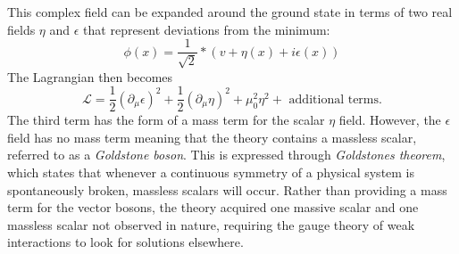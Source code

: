 This complex field can be expanded around the ground state in terms of two real fields $\eta$ and $\epsilon$ that represent deviations from the minimum:
\begin{equation}
\phi(x) = \frac{1}{\sqrt{2}}*(v+\eta(x)+i\epsilon(x))
\end{equation}
 The Lagrangian then becomes
\begin{equation}
\mathcal{L} = \frac{1}{2}(\partial_{\mu}\epsilon)^2 + \frac{1}{2}(\partial_{\mu}\eta)^2+\mu_0^2\eta^2 + \textrm{ additional terms}.
\end{equation}
The third term has the form of a mass term for the scalar $\eta$ field. However, the $\epsilon$ field has no mass term meaning that the theory contains a massless scalar, referred to as a \emph{Goldstone boson}. This is expressed through \emph{Goldstones theorem}, which states that whenever a continuous symmetry of a physical system is spontaneously broken, massless scalars will occur. Rather than providing a mass term for the vector bosons, the theory acquired one massive scalar and one massless scalar not observed in nature, requiring the gauge theory of weak interactions to look for solutions elsewhere.

